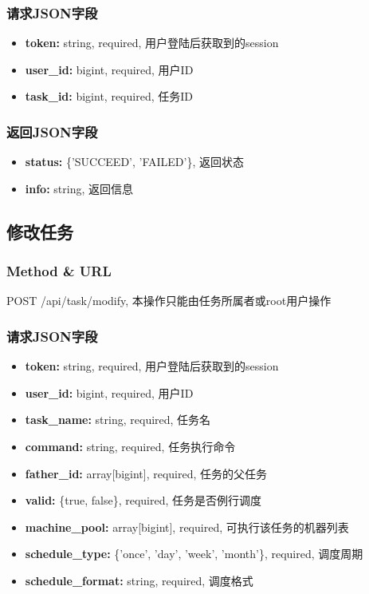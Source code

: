 ﻿\documentclass[a4paper]{report}
\begin{document}
\subsubsection{请求JSON字段}
\begin{itemize}
	\item \textbf{token:} string, required, 用户登陆后获取到的session
	\item \textbf{user\_id:} bigint, required, 用户ID
	\item \textbf{task\_id:} bigint, required, 任务ID
\end{itemize}

\subsubsection{返回JSON字段}
\begin{itemize}
	\item \textbf{status:} \{'SUCCEED', 'FAILED'\}, 返回状态
	\item \textbf{info:} string, 返回信息
\end{itemize}



\subsection{修改任务} %
\subsubsection{Method \& URL} %
POST /api/task/modify, 本操作只能由任务所属者或root用户操作

\subsubsection{请求JSON字段}
\begin{itemize}
	\item \textbf{token:} string, required, 用户登陆后获取到的session
	\item \textbf{user\_id:} bigint, required, 用户ID
	\item \textbf{task\_name:} string, required, 任务名
	\item \textbf{command:} string, required, 任务执行命令
	\item \textbf{father\_id:} array[bigint], required, 任务的父任务
	\item \textbf{valid:} \{true, false\}, required, 任务是否例行调度
	\item \textbf{machine\_pool:} array[bigint], required, 可执行该任务的机器列表
	\item \textbf{schedule\_type:} \{'once', 'day', 'week', 'month'\}, required, 调度周期
	\item \textbf{schedule\_format:} string, required, 调度格式	
\end{itemize}
\end{document}
